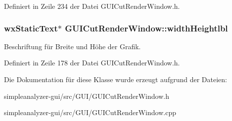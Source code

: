 Definiert in Zeile 234 der Datei G\-U\-I\-Cut\-Render\-Window.\-h.

\hypertarget{classGUICutRenderWindow_a26632978654028e6fbfaa6eef704ff06}{
\subsubsection[{width\-Heightlbl}]{\setlength{\rightskip}{0pt plus 5cm}wx\-Static\-Text$\ast$ G\-U\-I\-Cut\-Render\-Window\-::width\-Heightlbl\hspace{0.3cm}{\ttfamily [private]}}}\label{classGUICutRenderWindow_a26632978654028e6fbfaa6eef704ff06}
Beschriftung für Breite und Höhe der Grafik. 

Definiert in Zeile 178 der Datei G\-U\-I\-Cut\-Render\-Window.\-h.



Die Dokumentation für diese Klasse wurde erzeugt aufgrund der Dateien\-:\begin{DoxyCompactItemize}
\item 
simpleanalyzer-\/gui/src/\-G\-U\-I/G\-U\-I\-Cut\-Render\-Window.\-h\item 
simpleanalyzer-\/gui/src/\-G\-U\-I/G\-U\-I\-Cut\-Render\-Window.\-cpp\end{DoxyCompactItemize}
